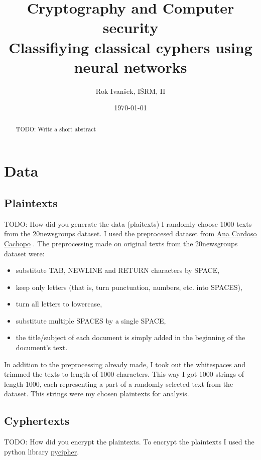 \documentclass[a4paper]{article}
\title{Cryptography and Computer security\\
Classifiying classical cyphers using neural networks}
\author{Rok Ivanšek, IŠRM, II}
\date{\today}
\begin{document}
\maketitle


\begin{abstract}
TODO: Write a short abstract
\end{abstract}

\section*{Data}

\subsection*{Plaintexts}
TODO: How did you generate the data (plaitexts)
I randomly choose 1000 texts from the 20newsgroups dataset. I used the preprocesed dataset from \href{http://ana.cachopo.org/datasets-for-single-label-text-categorization}{Ana Cardoso Cachopo} \cite{2007:phd-Ana-Cardoso-Cachopo}. The preprocessing made on original texts from the 20newsgroups dataset were:

\begin{itemize}	
    \item substitute TAB, NEWLINE and RETURN characters by SPACE,
    \item keep only letters (that is, turn punctuation, numbers, etc. into SPACES),
    \item turn all letters to lowercase,
    \item substitute multiple SPACES by a single SPACE,
    \item the title/subject of each document is simply added in the beginning of the document's text.
\end{itemize}

In addition to the preprocessing already made, I took out the whitespaces and trimmed the texts to length of 1000 characters. This way I got 1000 strings of length 1000, each representing a part of a randomly selected text from the dataset. This strings were my chosen plaintexts for analysis.

\subsection*{Cyphertexts}
TODO: How did you encrypt the plaintexts.
To encrypt the plaintexts I used the python library \href{https://github.com/jameslyons/pycipher}{pycipher}.
\end{document}
